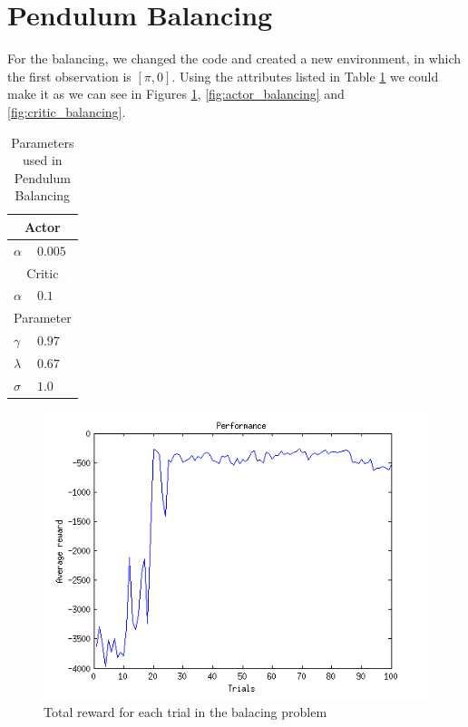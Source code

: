\documentclass{article}
\begin{document}

\section{Pendulum Balancing}
For the balancing, we changed the code and created a new environment, in which the first observation is $[\pi,0]$.
Using the attributes listed in Table \ref{tab:balancing} we could make it as we can see in Figures \ref{fig:cr_balancing}, \ref{fig:actor_balancing} and \ref{fig:critic_balancing}.

\begin{table}
    \centering
    \begin{tabular}{ll}
    \multicolumn{2}{c}{Actor}   \\ \hline
    $\alpha$       & $0.005$    \\
    \multicolumn{2}{c}{Critic}   \\ \hline
    $\alpha$       & $0.1$      \\
    \multicolumn{2}{c}{Parameter}   \\ \hline
    $\gamma$       & $0.97$     \\
    $\lambda$      & $0.67$     \\
    $\sigma$       & $1.0$      \\
    \end{tabular}
    \caption{Parameters used in Pendulum Balancing}
    \label{tab:balancing}
\end{table}

\begin{figure}[h!]
    \centering
    \includegraphics[width=.7\textwidth]{cr_balancing.png}
    \caption{Total reward for each trial in the balacing problem}
    \label{fig:cr_balancing}
\end{figure}
\end{document}

